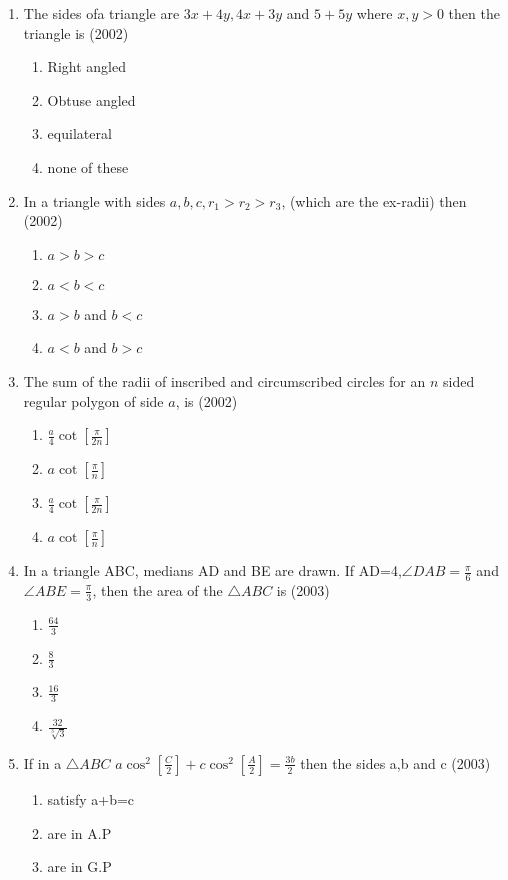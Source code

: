 \documentclass[12pt]{article}
\providecommand{\sbrak}[1]{\ensuremath{{}\left[#1\right]}}
\begin{document}
\begin{enumerate}
\begin{enumerate}
\item The sides ofa triangle are $3x+4y,4x+3y$ and $5+5y$ where $x,y>0$ then the triangle is (2002)
\begin{enumerate}
\item Right angled 
\item Obtuse angled 
\item equilateral
\item none of these
\end{enumerate}
\item In a triangle with sides $a,b,c,r_1>r_2>r_3$, (which are the ex-radii) then (2002)
\begin{enumerate}
\item $a>b>c$
\item $a<b<c$
\item $a>b$ and $b<c$
\item $a<b$ and $b>c$
\end{enumerate}
\item The sum of the radii of inscribed and circumscribed circles for an $n$ sided regular polygon of side $a$, is (2002)
\begin{enumerate}
\item $\frac{a}{4}\cot\sbrak{\frac{\pi}{2n}}$
\item $a\cot\sbrak{\frac{\pi}{n}}$
\item $\frac{a}{4}\cot\sbrak{\frac{\pi}{2n}}$
\item $a\cot\sbrak{\frac{\pi}{n}}$
\end{enumerate}
\item In a triangle ABC, medians AD and BE are drawn. If AD=4,$\angle DAB=\frac{\pi}{6}$ and $\angle ABE=\frac{\pi}{3}$, then the area of the $\triangle ABC$ is (2003)
\begin{enumerate}
\item $\frac{64}{3}$
\item $\frac{8}{3}$
\item $\frac{16}{3}$
\item $\frac{32}{\sqrt[3]{3}}$
\end{enumerate}
\item If in a $\triangle ABC$ $a\cos^2\sbrak{\frac{C}{2}}+c\cos^2\sbrak{\frac{A}{2}}=\frac{3b}{2}$ then the sides a,b and c (2003)
\begin{enumerate}
\item satisfy a+b=c
\item are in A.P
\item are in G.P

\end{enumerate}
\end{enumerate}
\end{enumerate}
\end{document}
